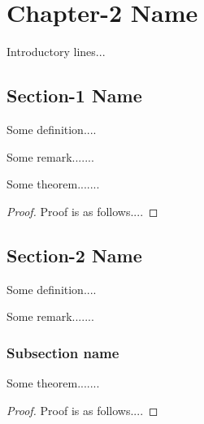 \chapter{Chapter-2 Name}

Introductory lines...



\section{Section-1 Name}
\begin{definition}\label{abc3}
Some definition....
\end{definition}

\begin{remark}
Some remark.......
\end{remark}



\begin{theorem}
Some theorem.......
\end{theorem}

\begin{proof}
Proof is as follows....
\end{proof}

\section{Section-2 Name}
\begin{definition}\label{abc4}
Some definition....
\end{definition}

\begin{remark}
Some remark.......
\end{remark}

\subsection{Subsection name}

\begin{theorem}
Some theorem.......
\end{theorem}

\begin{proof}
Proof is as follows....
\end{proof}
